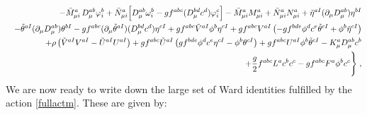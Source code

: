 \begin{appendix}
\begin{eqnarray}
&&
- \bar{M}^{a}_{\mu{i}}\,D^{ab}_{\mu}\varphi^{b}_{i}
+ \bar{N}^{a}_{\mu{i}}\Bigl[D^{ab}_{\mu}\omega^{b}_{i}
- gf^{abc}(D^{bd}_{\mu}c^{d})\varphi^{c}_{i}
\Bigr]
- \bar{M}^{a}_{\mu{i}}{M}^{a}_{\mu{i}}
+ \bar{N}^{a}_{\mu{i}}{N}^{a}_{\mu{i}}
+ \tilde{\eta}^{aI}(\partial_{\mu}D_{\mu}^{ab})\eta^{bI}
\nonumber \\
&&
- \tilde{\theta}^{aI}(\partial_{\mu}D_{\mu}^{ab})\theta^{bI}
- gf^{abc}(\partial_{\mu}\tilde{\theta}^{aI})(D^{bd}_{\mu}c^{d})\eta^{cI}
+ gf^{abc}\tilde{V}^{aI}\phi^{b}\eta^{cI}
+ gf^{abc}V^{aI}\left( 
- gf^{bde}\phi^{d}c^{e}\tilde{\theta}^{cI}
+ \phi^{b}\tilde{\eta}^{cI}
\right)
\nonumber \\
&&
+ \rho\left(\tilde{V}^{aI}V^{aI} - \tilde{U}^{aI}U^{aI}\right)
+ gf^{abc}\tilde{U}^{aI}\left( gf^{bde}\phi^{d}c^{e}\eta^{cI}
- \phi^{b}\theta^{cI}\right)
+ gf^{abc}U^{aI}\phi^{b}\tilde{\theta}^{cI}
- K^{a}_{\mu}D^{ab}_{\mu}c^{b} \nonumber \\ &&
+ \frac{g}{2}f^{abc} L^{a}c^{b}c^{c}
- gf^{abc} F^{a}\phi^{b}c^{c}
\Biggr\}\;,
\end{eqnarray}
We are now ready to write down the large set of Ward identities fulfilled by the action \eqref{fullactm}. These are given by: 


\end{appendix}
